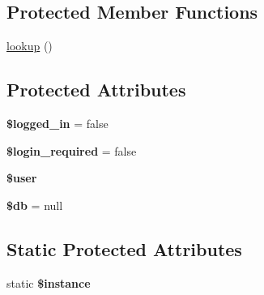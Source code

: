 \subsection*{Protected Member Functions}
\begin{DoxyCompactItemize}
\item 
\hyperlink{class_authentication_a714f7b786f7fa5e2e99ff156710a1dcd}{lookup} ()
\end{DoxyCompactItemize}
\subsection*{Protected Attributes}
\begin{DoxyCompactItemize}
\item 
\hypertarget{class_authentication_a6de65a132d4ad46300a9e1060f789bda}{
{\bfseries \$logged\_\-in} = false}
\label{class_authentication_a6de65a132d4ad46300a9e1060f789bda}

\item 
\hypertarget{class_authentication_aeaefdea8a64a14a5e2016bc9280ee543}{
{\bfseries \$login\_\-required} = false}
\label{class_authentication_aeaefdea8a64a14a5e2016bc9280ee543}

\item 
\hypertarget{class_authentication_a598ca4e71b15a1313ec95f0df1027ca5}{
{\bfseries \$user}}
\label{class_authentication_a598ca4e71b15a1313ec95f0df1027ca5}

\item 
\hypertarget{class_object_a1fa3127fc82f96b1436d871ef02be319}{
{\bfseries \$db} = null}
\label{class_object_a1fa3127fc82f96b1436d871ef02be319}

\end{DoxyCompactItemize}
\subsection*{Static Protected Attributes}
\begin{DoxyCompactItemize}
\item 
\hypertarget{class_authentication_ad9d7ce33ebb142b70e58b68052ca0ea8}{
static {\bfseries \$instance}}
\label{class_authentication_ad9d7ce33ebb142b70e58b68052ca0ea8}

\end{DoxyCompactItemize}


